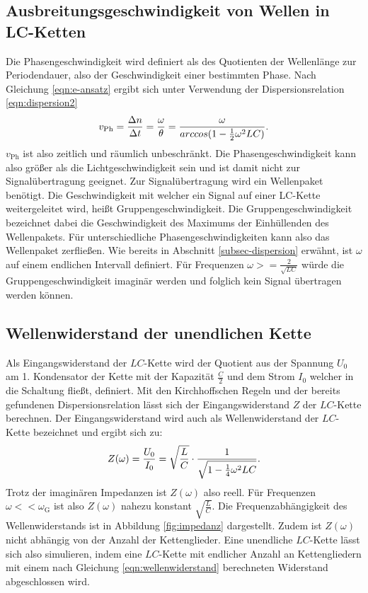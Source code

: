 \subsection{Ausbreitungsgeschwindigkeit von Wellen in LC-Ketten}
Die Phasengeschwindigkeit wird definiert als des Quotienten der Wellenlänge zur Periodendauer, also der Geschwindigkeit einer bestimmten Phase.
Nach Gleichung \eqref{eqn:e-ansatz} ergibt sich unter Verwendung der Dispersionsrelation  \eqref{eqn:dispersion2}
\begin{equation}
\centering
\label{v-phase}
v_{\mathrm{Ph}}=\frac{ \Delta n}{ \Delta t}=\frac{\omega}{\theta}=\frac{\omega}{arccos(1-\frac{1}{2}\omega^2LC)}.
\end{equation}
$v_{\mathrm{Ph}}$ ist also zeitlich und räumlich unbeschränkt. Die Phasengeschwindigkeit kann also größer als die Lichtgeschwindigkeit sein und ist damit nicht zur Signalübertragung geeignet.
Zur Signalübertragung wird ein Wellenpaket benötigt.
Die Geschwindigkeit mit welcher ein Signal auf einer LC-Kette weitergeleitet wird, heißt Gruppengeschwindigkeit.
Die Gruppengeschwindigkeit bezeichnet dabei die Geschwindigkeit des Maximums der Einhüllenden des Wellenpakets.
Für unterschiedliche Phasengeschwindigkeiten kann also das Wellenpaket zerfließen.
Wie bereits in Abschnitt \ref{subsec-dispersion} erwähnt, ist $\omega$ auf einem endlichen Intervall definiert.
Für Frequenzen $\omega>=\frac{2}{\sqrt{LC}}$ würde die Gruppengeschwindigkeit imaginär werden und folglich kein Signal übertragen werden können.
\subsection{Wellenwiderstand der unendlichen Kette}
Als Eingangswiderstand der $LC$-Kette wird der Quotient aus der Spannung $U_{\mathrm{0}}$ am 1. Kondensator der Kette mit der Kapazität $\frac{C}{2}$ und dem Strom $I_{\mathrm{0}}$ welcher in die Schaltung fließt, definiert.
Mit den Kirchhoffschen Regeln und der bereits gefundenen Dispersionsrelation lässt sich der Eingangswiderstand $Z$ der $LC$-Kette berechnen.
Der Eingangswiderstand wird auch als Wellenwiderstand der $LC$-Kette bezeichnet und ergibt sich zu:
\begin{equation}
\centering
\label{eqn:wellenwiderstand}
Z(\omega)=\frac{U_{\mathrm{0}}}{I_{\mathrm{0}}}=\sqrt{\frac{L}{C}}\cdot \frac{1}{\sqrt{1-\frac{1}{4}\omega^2LC}}.
\end{equation}
Trotz der imaginären Impedanzen ist $Z(\omega)$ also reell.
Für Frequenzen $\omega<<\omega_{\mathrm{G}}$ ist also $Z(\omega)$ nahezu konstant $\sqrt{\frac{L}{C}}$.
Die Frequenzabhängigkeit des Wellenwiderstands ist in Abbildung \ref{fig:impedanz} dargestellt.
Zudem ist $Z(\omega)$ nicht abhängig von der Anzahl der Kettenglieder. Eine unendliche $LC$-Kette lässt sich also simulieren, indem eine $LC$-Kette mit endlicher Anzahl an Kettengliedern mit einem nach Gleichung \eqref{eqn:wellenwiderstand} berechneten Widerstand abgeschlossen wird.

